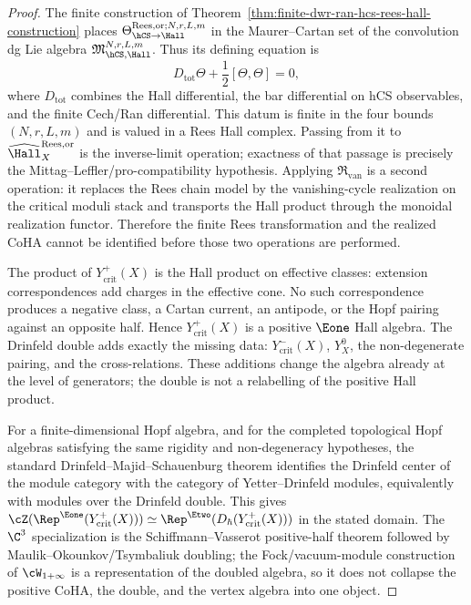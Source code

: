 \begin{proof}
The finite construction of
Theorem~\ref{thm:finite-dwr-ran-hcs-rees-hall-construction} places
$\Theta_{\hCS\to\Hall}^{\mathrm{Rees},\mathrm{or};N,r,L,m}$ in the
Maurer--Cartan set of the convolution dg Lie algebra
$\mathfrak M_{\hCS,\Hall}^{N,r,L,m}$. Thus its defining equation is
\[
 D_{\mathrm{tot}}\Theta+\frac{1}{2}[\Theta,\Theta]=0,
\]
where $D_{\mathrm{tot}}$ combines the Hall differential, the bar
differential on hCS observables, and the finite Cech/Ran differential.
This datum is finite in the four bounds $(N,r,L,m)$ and is valued in a
Rees Hall complex. Passing from it to
$\widehat{\Hall}^{\mathrm{Rees},\mathrm{or}}_X$ is the inverse-limit
operation; exactness of that passage is precisely the
Mittag--Leffler/pro-compatibility hypothesis. Applying
$\mathfrak R_{\mathrm{van}}$ is a second operation: it replaces the
Rees chain model by the vanishing-cycle realization on the critical
moduli stack and transports the Hall product through the monoidal
realization functor. Therefore the finite Rees transformation and the
realized CoHA cannot be identified before those two operations are
performed.

The product of $Y^+_{\mathrm{crit}}(X)$ is the Hall product on effective
classes: extension correspondences add charges in the effective cone.
No such correspondence produces a negative class, a Cartan current, an
antipode, or the Hopf pairing against an opposite half. Hence
$Y^+_{\mathrm{crit}}(X)$ is a positive $\Eone$ Hall algebra. The
Drinfeld double adds exactly the missing data:
$Y^-_{\mathrm{crit}}(X)$, $Y^0_X$, the non-degenerate pairing, and the
cross-relations. These additions change the algebra already at the
level of generators; the double is not a relabelling of the positive
Hall product.

For a finite-dimensional Hopf algebra, and for the completed
topological Hopf algebras satisfying the same rigidity and
non-degeneracy hypotheses, the standard Drinfeld--Majid--Schauenburg
theorem identifies the Drinfeld center of the module category with the
category of Yetter--Drinfeld modules, equivalently with modules over
the Drinfeld double. This gives
$\cZ(\Rep^{\Eone}(Y^+_{\mathrm{crit}}(X)))\simeq
\Rep^{\Etwo}(D_\hbar(Y^+_{\mathrm{crit}}(X)))$ in the stated domain.
The $\C^3$ specialization is the Schiffmann--Vasserot positive-half
theorem followed by Maulik--Okounkov/Tsymbaliuk doubling; the
Fock/vacuum-module construction of $\cW_{1+\infty}$ is a representation
of the doubled algebra, so it does not collapse the positive CoHA, the
double, and the vertex algebra into one object.
\end{proof}

